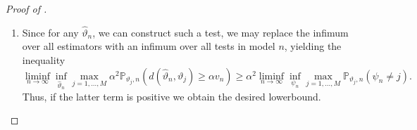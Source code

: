 \documentclass{book}
\begin{document}
\begin{proof}[Proof of ]
\begin{enumerate}
		      \begin{equation*}
			      d(\vartheta_i, \vartheta_j)> 2 \alpha v_n = \gamma, \quad i \neq j, \quad i,j=1, \dots, M.
		      \end{equation*}
		      Let us now consider the minimum distance test $\psi^{*}:\mathcal{X}_n \rightarrow \{1, \dots,M\}$:
		      \begin{equation*}
			      \psi^{*}=\mathrm{argmin}_{k=1, \dots, M} d(\hat{\vartheta}_n, \vartheta_k).
		      \end{equation*}
		      Since the hypothesis are seperated with radius $\gamma$, we observe that $\{\hat{\vartheta}_n \in B_{\gamma}(\vartheta_j)\} \subset\{\psi^{*} = j\}$. Thus, we clearly have the inclusion $\{\psi^{*} \neq j\}  \subset \{ \hat{\vartheta}_n  \in B_{\gamma}(\vartheta_j)\}^{c}=\{\hat{\vartheta}_n \in B_{\gamma}(\vartheta_j)^{c}\}$. However, it is still possible that $\hat{\vartheta}_n$ is the closest to $\vartheta_j$ but not inside of a $\gamma$ ball, so the inclusion might be strict. All in all, we obtain the bound
		      \begin{equation*}
			      \mathbb{P}_{\vartheta_j,n}(d(\hat{\vartheta}_n, \vartheta_j) \geq \gamma) \geq \mathbb{P}_{\vartheta_j, n}(\psi^{*}\neq j), \quad j=1, \dots,M.
		      \end{equation*}
		\item Since for any $\hat{\vartheta}_n$, we can construct such a test, we may replace the infimum over all estimators with an infimum over all tests in model $n$, yielding the inequality
		      \begin{equation*}
			      \liminf_{n \rightarrow \infty} \inf_{\hat{\vartheta}_n} \max_{j=1,\dots,M} \alpha^{2}\mathbb{P}_{\vartheta_j,n}(d(\hat{\vartheta}_n, \vartheta_j) \geq \alpha v_n) \geq \alpha^{2}  \liminf_{n \rightarrow \infty} \inf_{\psi_n} \max_{j=1,\dots,M} \mathbb{P}_{\vartheta_j,n}(\psi_n \neq j).
		      \end{equation*}
		      Thus, if the latter term is positive we obtain the desired lowerbound. \qedhere
	\end{enumerate}
\end{proof}






\end{document}
